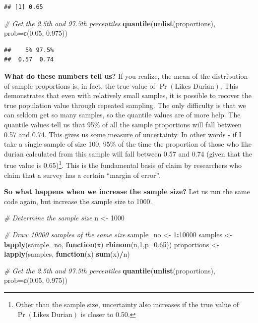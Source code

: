 \documentclass[openany]{book}
\newenvironment{Shaded}{\begin{snugshade}}{\end{snugshade}}
\newcommand{\KeywordTok}[1]{\textcolor[rgb]{0.13,0.29,0.53}{\textbf{#1}}}
\newcommand{\DataTypeTok}[1]{\textcolor[rgb]{0.13,0.29,0.53}{#1}}
\newcommand{\DecValTok}[1]{\textcolor[rgb]{0.00,0.00,0.81}{#1}}
\newcommand{\FloatTok}[1]{\textcolor[rgb]{0.00,0.00,0.81}{#1}}
\newcommand{\StringTok}[1]{\textcolor[rgb]{0.31,0.60,0.02}{#1}}
\newcommand{\CommentTok}[1]{\textcolor[rgb]{0.56,0.35,0.01}{\textit{#1}}}
\newcommand{\ControlFlowTok}[1]{\textcolor[rgb]{0.13,0.29,0.53}{\textbf{#1}}}
\newcommand{\OperatorTok}[1]{\textcolor[rgb]{0.81,0.36,0.00}{\textbf{#1}}}
\newcommand{\NormalTok}[1]{#1}
\let\rmarkdownfootnote\footnote%
\def\footnote{\protect\rmarkdownfootnote}
\begin{document}
\begin{verbatim}
## [1] 0.65
\end{verbatim}

\begin{Shaded}
\begin{Highlighting}[]
\CommentTok{# Get the 2.5th and 97.5th percentiles}
\KeywordTok{quantile}\NormalTok{(}\KeywordTok{unlist}\NormalTok{(proportions), }\DataTypeTok{prob=}\KeywordTok{c}\NormalTok{(}\FloatTok{0.05}\NormalTok{, }\FloatTok{0.975}\NormalTok{))}
\end{Highlighting}
\end{Shaded}

\begin{verbatim}
##    5% 97.5% 
##  0.57  0.74
\end{verbatim}

\textbf{What do these numbers tell us?} If you realize, the mean of the
distribution of sample proportions is, in fact, the true value of
\(\Pr(\text{Likes Durian})\). This demonstrates that even with
relatively small samples, it is possible to recover the true population
value through repeated sampling. The only difficulty is that we can
seldom get so many samples, so the quantile values are of more help. The
quantile values tell us that 95\% of all the sample proportions will
fall between 0.57 and 0.74. This gives us some measure of uncertainty.
In other words - if I take a single sample of size 100, 95\% of the time
the proportion of those who like durian calculated from this sample will
fall between 0.57 and 0.74 (given that the true value is 0.65)\footnote{Other
  than the sample size, uncertainty also increases if the true value of
  \(\Pr(\text{Likes Durian})\) is closer to 0.50.}. This is the
fundamental basis of claim by researchers who claim that a survey has a
certain ``margin of error''.

\textbf{So what happens when we increase the sample size?} Let us run
the same code again, but increase the sample size to 1000.

\begin{Shaded}
\begin{Highlighting}[]
\CommentTok{# Determine the sample size}
\NormalTok{n <-}\StringTok{ }\DecValTok{1000}

\CommentTok{# Draw 10000 samples of the same size}
\NormalTok{sample_no <-}\StringTok{ }\DecValTok{1}\OperatorTok{:}\DecValTok{10000}
\NormalTok{samples <-}\StringTok{ }\KeywordTok{lapply}\NormalTok{(sample_no, }\ControlFlowTok{function}\NormalTok{(x) }\KeywordTok{rbinom}\NormalTok{(n,}\DecValTok{1}\NormalTok{,}\DataTypeTok{p=}\FloatTok{0.65}\NormalTok{))}
\NormalTok{proportions <-}\StringTok{ }\KeywordTok{lapply}\NormalTok{(samples, }\ControlFlowTok{function}\NormalTok{(x) }\KeywordTok{sum}\NormalTok{(x)}\OperatorTok{/}\NormalTok{n)}

\CommentTok{# Get the 2.5th and 97.5th percentiles}
\KeywordTok{quantile}\NormalTok{(}\KeywordTok{unlist}\NormalTok{(proportions), }\DataTypeTok{prob=}\KeywordTok{c}\NormalTok{(}\FloatTok{0.05}\NormalTok{, }\FloatTok{0.975}\NormalTok{))}
\end{Highlighting}
\end{Shaded}
\end{document}
